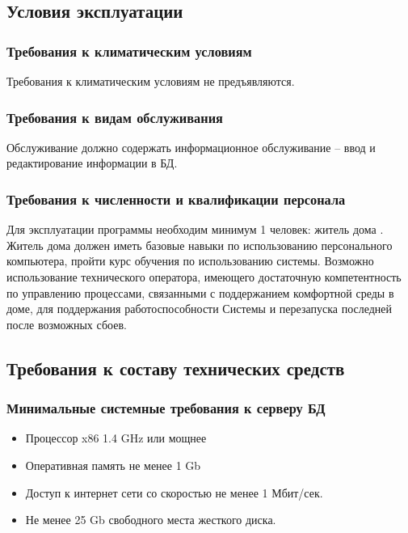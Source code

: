   \subsection{Условия эксплуатации}
    \subsubsection{Требования к климатическим условиям}
      Требования к климатическим условиям не предъявляются.
    \subsubsection{Требования к видам обслуживания}
      Обслуживание должно содержать информационное обслуживание – ввод и редактирование информации в БД.
    \subsubsection{Требования к численности и квалификации персонала}
      Для эксплуатации программы необходим минимум 1 человек: житель дома .
Житель дома должен иметь базовые навыки по использованию персонального компьютера, пройти курс обучения по использованию системы.
Возможно использование технического оператора, имеющего достаточную компетентность по управлению процессами, связанными с поддержанием комфортной среды в доме, для поддержания работоспособности Системы и перезапуска последней после возможных сбоев.
  \subsection{Требования к составу технических средств}
    \subsubsection{Минимальные системные требования к серверу БД}
      \begin{itemize}
        \item Процессор x86 1.4 GHz или мощнее
        \item Оперативная память не менее 1 Gb
        \item Доступ к интернет сети со скоростью не менее 1 Мбит/сек. 
        \item Не менее 25 Gb свободного места жесткого диска.
      \end{itemize}
